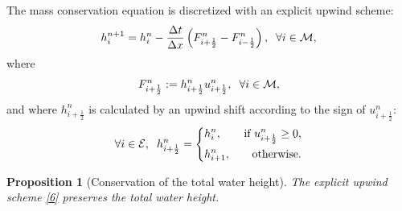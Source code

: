 \documentclass[11pt,a4paper,center,notitlepage]{article}
\numberwithin{equation}{section}
\newtheorem{prop}{Proposition}
\begin{document}
The mass conservation equation is discretized with an explicit upwind scheme:
\begin{align}
\label{6}
h_i^{n + 1} = h_i^n - \frac{{\Delta t}}{{\Delta x}}\left( {F_{i + \frac{1}{2}}^n - F_{i - \frac{1}{2}}^n} \right), \hspace{2mm} \forall i \in \mathcal{M},
\end{align}
where 
\begin{align*}
F_{i + \frac{1}{2}}^n := h_{i + \frac{1}{2}}^nu_{i + \frac{1}{2}}^n, \hspace{2mm} \forall i \in \mathcal{M},
\end{align*}
and where $h_{i + \frac{1}{2}}^n$ is calculated by an upwind shift according to the sign of $u_{i + \frac{1}{2}}^n$:
\begin{equation*}
\forall i \in \mathcal{E}, \hspace{2mm} h_{i + \frac{1}{2}}^n = \left\{ \begin{split} 
& h_i^n, & \mbox{ if } u_{i + \frac{1}{2}}^n \ge 0,\\
& h_{i + 1}^n, & \mbox{otherwise}. 
\end{split} \right.
\end{equation*}

\begin{prop}[Conservation of the total water height]
The explicit upwind scheme \eqref{6} preserves the total water height.
\end{prop}
\end{document}
